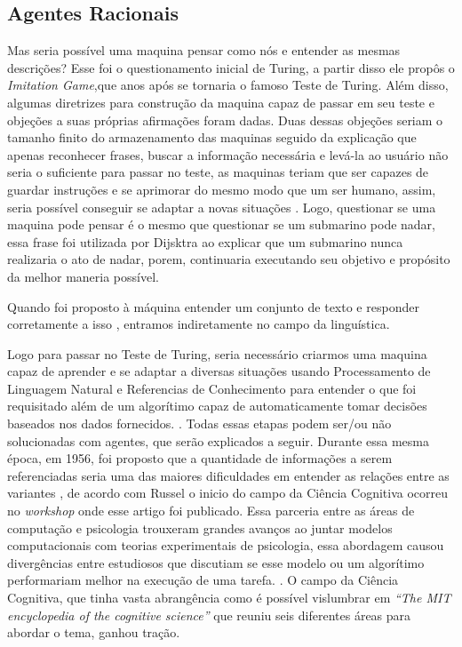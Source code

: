 \subsection{Agentes Racionais}
Mas seria possível uma maquina pensar como nós e entender as mesmas descrições? Esse foi o questionamento inicial de Turing, a partir disso ele propôs o \textit{Imitation Game},que anos após se tornaria o famoso Teste de Turing. Além disso, algumas diretrizes para construção da maquina capaz de passar em seu teste e objeções a suas próprias afirmações foram dadas. Duas dessas objeções seriam o tamanho finito do armazenamento das maquinas seguido da explicação que apenas reconhecer frases, buscar a informação necessária e levá-la ao usuário não seria o suficiente para passar no teste, as maquinas teriam que ser capazes de guardar instruções e se aprimorar do mesmo modo que um ser humano, assim, seria possível conseguir se adaptar a novas situações \cite[144-155]{turing1950}. Logo, questionar se uma maquina pode pensar é o mesmo que questionar se um submarino pode nadar, essa frase foi utilizada por Dijsktra \cite{dijkstra898} ao explicar que um submarino nunca realizaria o ato de nadar, porem, continuaria executando seu objetivo e propósito da melhor maneria possível.

Quando foi proposto à máquina entender um conjunto de texto e responder corretamente a isso \cite[146]{turing1950}, entramos indiretamente no campo da linguística.

Logo para passar no Teste de Turing, seria necessário criarmos uma maquina capaz de aprender e se adaptar a diversas situações usando Processamento de Linguagem Natural e Referencias de Conhecimento para entender o que foi requisitado além de um algorítimo capaz de automaticamente tomar decisões baseados nos dados fornecidos. \cite[2]{russell2003artificial}. Todas essas etapas podem ser/ou não solucionadas com agentes, que serão explicados a seguir. Durante essa mesma época, em 1956, foi proposto que a quantidade de informações a serem referenciadas seria uma das maiores dificuldades em entender as relações entre as variantes \cite[81-82]{miller1956magical}, de acordo com Russel \cite[13]{russell2003artificial} o inicio do campo da Ciência Cognitiva ocorreu no \textit{workshop} onde esse artigo foi publicado. Essa parceria entre as áreas de computação e psicologia trouxeram grandes avanços ao juntar modelos computacionais com teorias experimentais de psicologia, essa abordagem causou divergências entre estudiosos que discutiam se esse modelo ou um algorítimo performariam melhor na execução de uma tarefa. \cite[3]{russell2003artificial}. O campo da Ciência Cognitiva,  que tinha vasta abrangência como é possível vislumbrar em \textit{“The MIT encyclopedia of the cognitive science”} \cite{wilson2001encyclopedia} que reuniu seis diferentes áreas para abordar o tema, ganhou tração.

